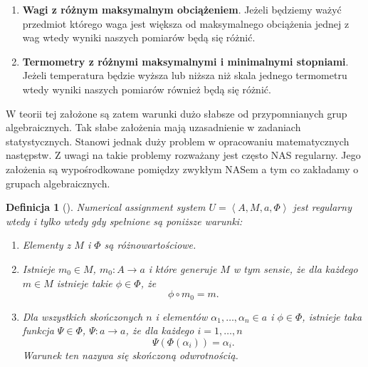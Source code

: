 \documentclass[12pt,a4paper]{report}
\newtheorem{definition}{Definicja}[chapter]
\newcommand{\tuple}[1]{\left\langle {#1} \right\rangle}
\begin{document}
\begin{enumerate}
\item
\textbf{Wagi z różnym maksymalnym obciążeniem}. Jeżeli będziemy ważyć przedmiot którego waga jest większa od maksymalnego obciążenia jednej z wag wtedy wyniki naszych pomiarów będą się różnić. 
\item
\textbf{Termometry z różnymi maksymalnymi i minimalnymi stopniami}. Jeżeli temperatura będzie wyższa lub niższa niż skala jednego termometru wtedy wyniki naszych pomiarów również będą się różnić.
\end{enumerate}  
W teorii tej założone są zatem warunki dużo słabsze od przypomnianych grup algebraicznych. Tak słabe założenia mają uzasadnienie w zadaniach statystycznych. Stanowi jednak duży problem w opracowaniu matematycznych następstw. Z uwagi na takie problemy rozważany jest często NAS regularny. Jego założenia są wypośrodkowane pomiędzy zwykłym NASem a tym co zakładamy o grupach algebraicznych.  
\begin{definition}[{\citep[Def. 2]{adams1965theory}}]
Numerical assignment system $U=\tuple{A, M, a, \Phi}$ jest regularny wtedy i tylko wtedy gdy spełnione są poniższe warunki:
\begin{enumerate}
\item
Elementy z $M$ i $\Phi$ są różnowartościowe.
\item
Istnieje $m_{0}\in M$, $m_0:A\to a$ i które generuje $M$ w tym sensie, że dla każdego $m\in M$ istnieje takie $\phi\in \Phi$, że
$$
\phi \circ m_{0}=m.
$$
\item
Dla wszystkich skończonych $n$ i elementów $\alpha_{1},\dots,\alpha_{n}\in a$ i  $\phi\in \Phi$, istnieje taka funkcja $\Psi\in \Phi$, $\Psi:a\to a$, że dla każdego $i=1,\ldots,n$ 
$$
\Psi(\Phi(\alpha_{i}))=\alpha_{i}.
$$
Warunek ten nazywa się skończoną odwrotnością.
\end{enumerate}
\end{definition}
\end{document}
